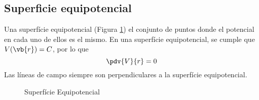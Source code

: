 \documentclass{./FisicaII.tex}
\begin{document}
\subsection{Superficie equipotencial}
Una superfície equipotencial (Figura \ref{fig:superficie-equipotencial}) el conjunto de puntos donde el potencial en cada uno de ellos es el mismo. En una superfície equipotencial, se cumple que $V(\vb{r})=C$, por lo que
\[
	\pdv{V}{r}=0
\]
Las líneas de campo siempre son perpendiculares a la superfície equipotencial.
\begin{figure}[ht]
    \centering
    \caption{Superfície Equipotencial}
    \label{fig:superficie-equipotencial}
\end{figure}
\end{document}
